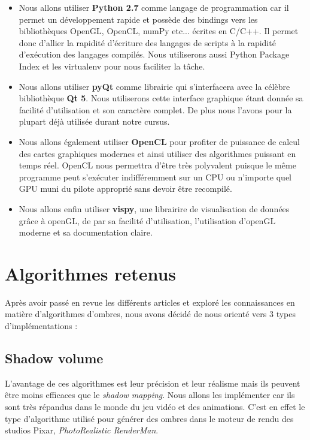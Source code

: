 \documentclass[a4paper,10pt]{report}
\begin{document}
\begin{itemize}
\item{Nous allons utiliser \textbf{Python 2.7} comme langage de programmation car il permet un développement rapide et possède des bindings vers les bibliothèques OpenGL, OpenCL, numPy etc... écrites en C/C++. Il permet donc d'allier la rapidité d'écriture des langages de scripts à la rapidité d'exécution des langages compilés. Nous utiliserons aussi Python Package Index et les virtualenv pour nous faciliter la t\^ache.}
\item{Nous allons utiliser \textbf{pyQt} comme librairie qui s'interfacera avec la célèbre bibliothèque \textbf{Qt 5}. Nous utiliserons cette interface graphique étant donnée sa facilité d'utilisation et son caractère complet. De plus nous l'avons pour la plupart déjà utilisée durant notre cursus.}
\item{Nous allons également utiliser \textbf{OpenCL} pour profiter de puissance de calcul des cartes graphiques modernes et ainsi utiliser des algorithmes puissant en temps réel. OpenCL nous permettra d'être très polyvalent puisque le même programme peut s'exécuter indifféremment sur un CPU ou n'importe quel GPU muni du pilote approprié sans devoir être recompilé.}
\item{Nous allons enfin utiliser \textbf{vispy}, une librairire de visualisation de données grâce à openGL, de par sa facilité d'utilisation, l'utilisation d'openGL moderne et sa documentation claire. }
\end{itemize}

\section{Algorithmes retenus}

Après avoir passé en revue les différents articles et exploré les connaissances en matière d'algorithmes d'ombres, nous avons décidé de nous orienté vers 3 types d'implémentations : 

\subsection{Shadow volume}

L'avantage de ces algorithmes est leur précision et leur réalisme mais ils peuvent être moins efficaces que le \textit{shadow mapping}. Nous allons les implémenter car ils sont très répandus dans le monde du jeu vidéo et des animations. C'est en effet le type d'algorithme utilisé pour générer des ombres dans le moteur de rendu des studios Pixar, \textit{PhotoRealistic RenderMan}. 
\end{document}
